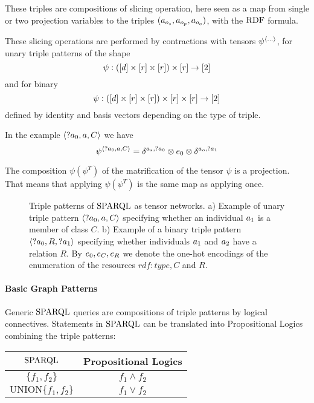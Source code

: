These triples are compositions of slicing operation, here seen as a map from single or two projection variables to the triples $(a_{o_{s}}, a_{o_{p}}, a_{o_{o}})$, with the $\mathrm{RDF}$ formula.


These slicing operations are performed by contractions with tensors $\psi^{\braket{...}}$, for unary triple patterns of the shape
	\[ \psi : \left( [d] \times [r] \times [r] \right) \times [r] \rightarrow [2] \]
and for binary
	\[ \psi : \left( [d] \times [r] \times [r] \right) \times [r] \times [r] \rightarrow [2] \]
defined by identity and basis vectors depending on the type of triple.

In the example $\braket{?a_{0},a,C}$ we have
	\[ \psi^{\braket{?a_{0},a,C}} = \delta^{a_{s},?a_{0}} \otimes e_{0} \otimes \delta^{a_{o},?a_{1}}   \]


%
The composition $\psi (\psi^T)$ of the matrification of the tensor $\psi$ is a projection.
That means that applying $\psi (\psi^T)$ is the same map as applying once.


\begin{figure}[h]
\begin{center}
		
\end{center}
\caption{Triple patterns of $\mathrm{SPARQL}$ as tensor networks.
	a) Example of unary triple pattern $\braket{?a_{0},a,C}$ specifying whether an individual $a_{1}$ is a member of class $C$.
	b) Example of a binary triple pattern $\braket{?a_{0},R,?a_{1}}$ specifying whether individuals $a_{1}$ and $a_{2}$ have a relation $R$.
		By $e_{0},e_{C},e_{R}$ we denote the one-hot encodings of the enumeration of the resources $rdf:type, C$ and $R$.}
\label{fig:triplePatterns}
\end{figure}




\paragraph{Basic Graph Patterns}

Generic $\mathrm{SPARQL}$ queries are compositions of triple patterns by logical connectives. %
Statements in $\mathrm{SPARQL}$ can be translated into Propositional Logics combining the triple patterns:
\begin{center}
	\begin{tabular}{|c|c|}
  	\hline
 	\textbf{$\mathrm{SPARQL}$} & \textbf{Propositional Logics} \\
  	\hline
 	$\{f_1, f_2\}$ & $f_1\land f_2$ \\
  	\hline
 	$\mathrm{UNION}\{f_1, f_2\} $& $f_1\lor f_2$ \\
  	\hline
	\end{tabular}
\end{center}

